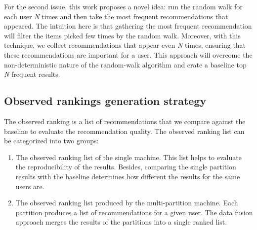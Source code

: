 For the second issue, this work proposes a novel idea: run the random walk for each user \emph{N} times and then take the most frequent recommendations that appeared. The intuition here is that gathering the most frequent recommendation will filter the items picked few times by the random walk. Moreover, with this technique, we collect recommendations that appear even \emph{N} times, ensuring that these recommendations are important for a user. This approach will overcome the non-deterministic nature of the random-walk algorithm and crate a baseline top \emph{N} frequent results.


\subsection{Observed rankings generation strategy}
\label{subsec:comparing-recommendtions}
The observed ranking is a list of recommendations that we compare against the baseline to evaluate the recommendation quality. The observed ranking list can be categorized into two groups:

\begin{enumerate}
    \item The observed ranking list of the single machine. This list helps to evaluate the reproducibility of the results. Besides, comparing the single partition results with the baseline determines how different the results for the same users are. 
    
    \item The observed ranking list produced by the multi-partition machine. Each partition produces a list of recommendations for a given user. The data fusion approach merges the results of the partitions into a single ranked list. 
\end{enumerate}
